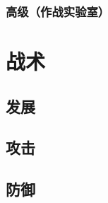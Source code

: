 \documentclass[12pt]{ctexart}
\begin{document}
			\subsubsection{高级（作战实验室）}
	\newpage
	
	\section{战术}
		\subsection{发展}
		\subsection{攻击}
		\subsection{防御}
\end{document}

